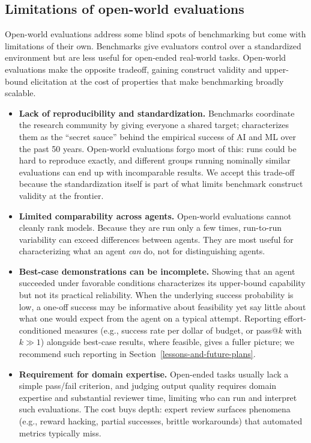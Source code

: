 \documentclass{article}
\begin{document}
\subsection{Limitations of open-world evaluations}\label{limitations-of-open-world-evaluations}

Open-world evaluations address some blind spots of benchmarking but come with limitations of their own. Benchmarks give evaluators control over a standardized environment but are less useful for open-ended real-world tasks. Open-world evaluations make the opposite tradeoff, gaining construct validity and upper-bound elicitation at the cost of properties that make benchmarking broadly scalable.

\begin{itemize}[leftmargin=9pt, topsep=-3pt, itemsep=3pt, parsep=0pt]
\item \textbf{Lack of reproducibility and standardization.} Benchmarks coordinate the research community by giving everyone a shared target; \citet{tandfonlineCom101080} characterizes them as the ``secret sauce'' behind the empirical success of AI and ML over the past 50 years. Open-world evaluations forgo most of this: runs could be hard to reproduce exactly, and different groups running nominally similar evaluations can end up with incomparable results. We accept this trade-off because the standardization itself is part of what limits benchmark construct validity at the frontier.
\item \textbf{Limited comparability across agents.} Open-world evaluations cannot cleanly rank models. Because they are run only a few times, run-to-run variability can exceed differences between agents. They are most useful for characterizing what an agent \emph{can} do, not for distinguishing agents.
\item \textbf{Best-case demonstrations can be incomplete.} Showing that an agent succeeded under favorable conditions characterizes its upper-bound capability but not its practical reliability. When the underlying success probability is low, a one-off success may be informative about feasibility yet say little about what one would expect from the agent on a typical attempt. Reporting effort-conditioned measures (e.g., success rate per dollar of budget, or pass@$k$ with $k \gg 1$) alongside best-case results, where feasible, gives a fuller picture; we recommend such reporting in Section~\ref{lessons-and-future-plans}.
\item \textbf{Requirement for domain expertise.} Open-ended tasks usually lack a simple pass/fail criterion, and judging output quality requires domain expertise and substantial reviewer time, limiting who can run and interpret such evaluations. The cost buys depth: expert review surfaces phenomena (e.g., reward hacking, partial successes, brittle workarounds) that automated metrics typically miss.

\end{itemize}
\end{document}
